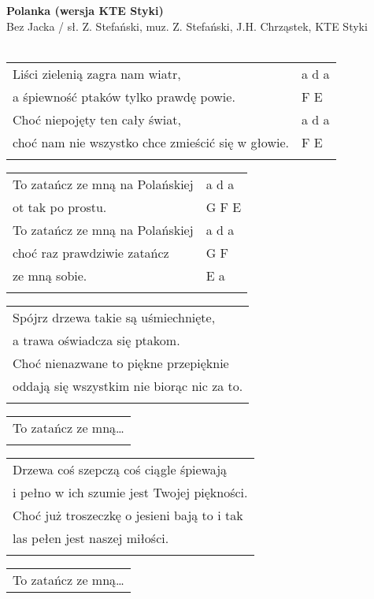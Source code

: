 \documentclass[a5paper]{article}
\begin{document}


\noindent
\fontsize{12pt}{15pt}\selectfont
\textbf{Polanka (wersja KTE Styki)} \\
\fontsize{8pt}{10pt}\selectfont
Bez Jacka / sł. Z. Stefański, muz. Z. Stefański, J.H. Chrząstek, KTE Styki \\ \\
\fontsize{10pt}{12pt}\selectfont
{}
\begin{tabular}{@{}p{8.50cm}p{3cm}@{}}
\noindent
Liści zielenią zagra nam wiatr, & a d a \\
a śpiewność ptaków tylko prawdę powie. & F E \\
Choć niepojęty ten cały świat, & a d a \\
choć nam nie wszystko chce zmieścić się w głowie. & F E \\ \\
\end{tabular}

\noindent
\begin{tabular}{@{}p{7.50cm}p{3cm}@{}}
To zatańcz ze mną na Polańskiej & a d a \\
ot tak po prostu. & G F E \\
To zatańcz ze mną na Polańskiej & a d a \\
choć raz prawdziwie zatańcz & G F \\
ze mną sobie. & E a \\ \\
\end{tabular}

\noindent
\begin{tabular}{@{}p{8.50cm}@{}}
Spójrz drzewa takie są uśmiechnięte, \\
a trawa oświadcza się ptakom. \\
Choć nienazwane to piękne przepięknie \\
oddają się wszystkim nie biorąc nic za to. \\ \\
\end{tabular}

\noindent
\begin{tabular}{@{}p{7.50cm}@{}}
To zatańcz ze mną… \\ \\
\end{tabular}

\noindent
\begin{tabular}{@{}p{8.50cm}@{}}
Drzewa coś szepczą coś ciągle śpiewają \\
i pełno w ich szumie jest Twojej piękności. \\
Choć już troszeczkę o jesieni bają to i tak \\
las pełen jest naszej miłości. \\ \\
\end{tabular}

\noindent
\begin{tabular}{@{}p{7.50cm}@{}}
To zatańcz ze mną…
\end{tabular}
\end{document}
